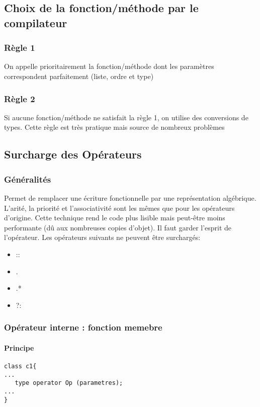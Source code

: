 \documentclass[10pt,a4paper,twoside]{article}
\begin{document}
\subsection{Choix de la fonction/méthode par le compilateur}
\subsubsection{Règle 1}
On appelle prioritairement la fonction/méthode dont les paramètres correspondent parfaitement (liste, ordre et type)

\subsubsection{Règle 2}
Si aucune fonction/méthode ne satisfait la règle 1, on utilise des conversions de types. Cette règle est très pratique mais source de nombreux problèmes

\subsection{Surcharge des Opérateurs}
\subsubsection{Généralités}
Permet de remplacer une écriture fonctionnelle par une représentation algébrique. L'arité, la priorité et l’associativité sont les mêmes que pour les opérateurs d'origine. Cette technique rend le code plus lisible mais peut-être moins performante (dû aux nombreuses copies d'objet). Il faut garder l'esprit de l'opérateur. Les opérateurs suivants ne peuvent être surchargés:
\begin{itemize}
\item ::
\item .
\item .*
\item ?:
\end{itemize}

\subsubsection{Opérateur interne : fonction memebre}
\paragraph{Principe}
\begin{verbatim}
class c1{
...
   type operator Op (parametres);
...
}
\end{verbatim}
\end{document}
